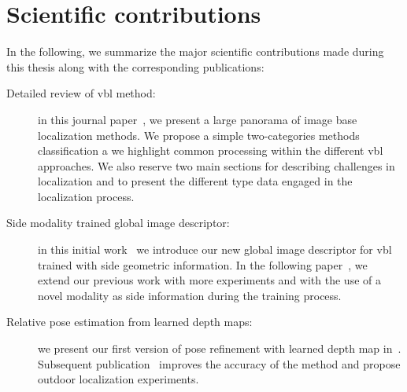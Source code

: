 \section{Scientific contributions}

In the following, we summarize the major scientific contributions made during this thesis along with the corresponding publications:

\begin{description}
	\item[Detailed review of \ac{vbl} method:] in this journal paper~\citep{Piasco2017}, we present a large panorama of image base localization methods. We propose a simple two-categories methods classification a we highlight common processing within the different \ac{vbl} approaches. We also reserve two main sections for describing challenges in localization and to present the different type data engaged in the localization process.
	\item[Side modality trained global image descriptor:] in this initial work~\citep{Piasco2019} we introduce our new global image descriptor for \ac{vbl} trained with side geometric information. In the following paper~\citep{Piasco2019c}, we extend our previous work with more experiments and with the use of a novel modality as side information during the training process.
	\item[Relative pose estimation from learned depth maps:] we present our first version of pose refinement with learned depth map in~\citep{Piasco2019a}. Subsequent publication~\citep{Piasco2019b} improves the accuracy of the method and propose outdoor localization experiments.
\end{description}

